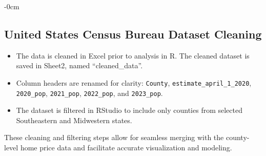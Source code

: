 \documentclass[journal,article,submit,pdftex,moreauthors]{Definitions/mdpi}
\begin{document}
\begin{adjustwidth}{-\extralength}{0cm}
\subsection*{United States Census Bureau Dataset Cleaning}


\begin{itemize}
  \setlength\itemsep{0pt}
  \setlength\parskip{0pt}
  \setlength\parsep{0pt}
  \item The data is cleaned in Excel prior to analysis in R. The cleaned dataset is saved in Sheet2, named ``cleaned\_data''.
  \item Column headers are renamed for clarity: \texttt{County}, \texttt{estimate\_april\_1\_2020}, \texttt{2020\_pop}, \texttt{2021\_pop}, \texttt{2022\_pop}, and \texttt{2023\_pop}.
  \item The dataset is filtered in RStudio to include only counties from selected Southeastern and Midwestern states.
\end{itemize}

These cleaning and filtering steps allow for seamless merging with the county-level home price data and facilitate accurate visualization and modeling.

\begin{comment}
{\color{red}
\begin{itemize}
  \setlength\itemsep{0pt}
  \setlength\parskip{0pt}
  \setlength\parsep{0pt}
  \item The data is cleaned in Excel prior to analysis in R. The cleaned dataset is saved in Sheet2, named ``cleaned\_data''.
  \item Column headers are renamed for clarity: \texttt{County}, \texttt{estimate\_april\_1\_2020}, \texttt{2020\_pop}, \texttt{2021\_pop}, \texttt{2022\_pop}, and \texttt{2023\_pop}.
  \item The dataset is filtered in RStudio to include only counties from selected Southeastern and Midwestern states.
\end{itemize}
}

{\color{red}{These cleaning and filtering steps allow for seamless merging with the county-level home price data and facilitate accurate visualization and modeling.}
\end{comment}



\end{adjustwidth}
\end{document}
